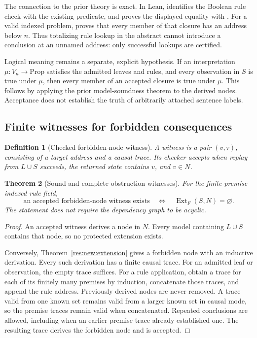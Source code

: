 \documentclass[11pt,oneside]{article}
\theoremstyle{komorebiplain}
\newtheorem{theorem}{Theorem}[section]
\theoremstyle{komorebidefinition}
\newtheorem{definition}[theorem]{Definition}
\theoremstyle{komorebiremark}
\begin{document}
The connection to the prior theory is exact. In Lean,  identifies the Boolean rule check with the existing  predicate, and  proves the displayed equality with . For a valid indexed problem,  proves that every member of that closure has an address below $n$. Thus totalizing rule lookup in the abstract  cannot introduce a conclusion at an unnamed address: only successful lookups are certified.

Logical meaning remains a separate, explicit hypothesis. If an interpretation $\mu:V_n\to\mathrm{Prop}$ satisfies the admitted leaves and rules, and every observation in $S$ is true under $\mu$, then every member of an accepted closure is true under $\mu$. This follows by applying the prior model-soundness theorem to the derived nodes. Acceptance does not establish the truth of arbitrarily attached sentence labels.

\subsection{Finite witnesses for forbidden consequences}
\label{sec:trace-obstruction}

\begin{definition}[Checked forbidden-node witness]
\label{res:trace:witness}
A witness is a pair $(v,\tau)$, consisting of a target address and a causal trace. Its checker accepts when replay from $L\cup S$ succeeds, the returned state contains $v$, and $v\in N$.
\end{definition}

\begin{theorem}[Sound and complete obstruction witnesses]
\label{res:trace:complete}
For the finite-premise indexed rule field,
\[
 \boxed{
 \text{an accepted forbidden-node witness exists}
 \quad\Longleftrightarrow\quad
 \operatorname{Ext}_F(S,N)=\varnothing.
 }
\]
The statement does not require the dependency graph to be acyclic.
\end{theorem}
\begin{proof}
An accepted witness derives a node in $N$. Every model containing $L\cup S$ contains that node, so no protected extension exists.

Conversely, Theorem~\ref{res:new:extension} gives a forbidden node with an inductive derivation. Every such derivation has a finite causal trace. For an admitted leaf or observation, the empty trace suffices. For a rule application, obtain a trace for each of its finitely many premises by induction, concatenate those traces, and append the rule address. Previously derived nodes are never removed. A trace valid from one known set remains valid from a larger known set in causal mode, so the premise traces remain valid when concatenated. Repeated conclusions are allowed, including when an earlier premise trace already established one. The resulting trace derives the forbidden node and is accepted.
\end{proof}
\end{document}
